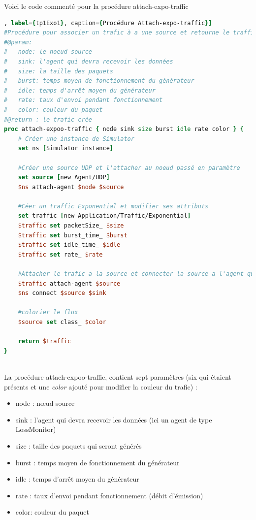 \documentclass[11pt]{article}
\begin{document}
Voici le code commenté pour la procédure attach-expo-traffic

\begin{lstlisting}[language=tcl,  numbers=none, framexleftmargin=0pt, 	framextopmargin=0pt, framexbottommargin=0pt], label={tp1Exo1}, caption={Procédure Attach-expo-traffic}]
#Procédure pour associer un trafic à a une source et retourne le traffic
#@param:
#	node: le noeud source
#	sink: l'agent qui devra recevoir les données
#	size: la taille des paquets
#	burst: temps moyen de fonctionnement du générateur
#	idle: temps d'arrêt moyen du générateur
#	rate: taux d'envoi pendant fonctionnement
#	color: couleur du paquet
#@return : le trafic crée
proc attach-expoo-traffic { node sink size burst idle rate color } { 
	# Créer une instance de Simulator
	set ns [Simulator instance]
	
	#Créer une source UDP et l'attacher au noeud passé en paramètre
	set source [new Agent/UDP]
	$ns attach-agent $node $source
	
	#Céer un traffic Exponential et modifier ses attributs
	set traffic [new Application/Traffic/Exponential]
	$traffic set packetSize_ $size
	$traffic set burst_time_ $burst
	$traffic set idle_time_ $idle
	$traffic set rate_ $rate

	#Attacher le trafic a la source et connecter la source a l'agent qui va recevoir les données
	$traffic attach-agent $source
	$ns connect $source $sink

	#colorier le flux
	$source set class_ $color

	return $traffic
}
\end{lstlisting} 

~\\
La procédure attach-expoo-traffic, contient sept paramètres (six qui  étaient présents et une \textit{color} ajouté pour modifier la couleur du trafic)  :
\begin{itemize}
	\item node : nœud source
	\item sink : l'agent qui devra recevoir les données (ici un agent de type LossMonitor)
	\item size : taille des paquets qui seront générés
	\item burst : temps moyen de fonctionnement du générateur
	\item idle : temps d'arrêt moyen du générateur
	\item rate : taux d'envoi pendant fonctionnement (débit d'émission)
	\item color: couleur du paquet
\end{itemize}
 
\end{document}
